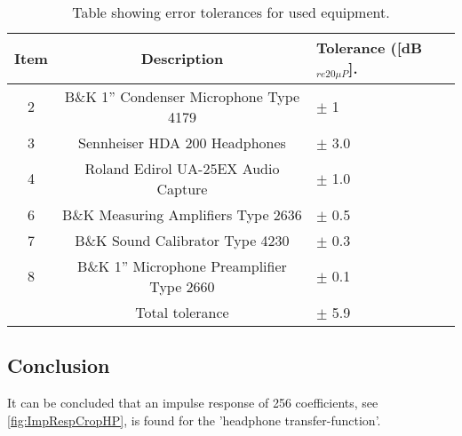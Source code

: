 \begin{table}[H]
	\centering
	\begin{tabular}{ c c l } \toprule
	{Item}	& 		{Description} 							& {Tolerance ([dB$_{re20\mu P}$]}.\\ \bottomrule 
		2	&	B\&K 1'' Condenser Microphone Type 4179 	& $\pm$ 1		\\
		3	&	Sennheiser HDA 200 Headphones				& $\pm$ 3.0		\\
		4	&	Roland Edirol UA-25EX Audio Capture			& $\pm$ 1.0		\\
		6	&	B\&K Measuring Amplifiers Type 2636			& $\pm$ 0.5		\\
		7	&	B\&K Sound Calibrator Type 4230				& $\pm$ 0.3		\\ 
		8	&	B\&K 1'' Microphone Preamplifier Type 2660	& $\pm$ 0.1		\\ \bottomrule
			&	Total tolerance								& $\pm$ 5.9		\\ \bottomrule	
	\end{tabular}
	\caption{Table showing error tolerances for used equipment.}
	\label{TolerancesHP}
\end{table}

\subsection{Conclusion}
It can be concluded that an impulse response of 256 coefficients, see \autoref{fig:ImpRespCropHP}, is found for the 'headphone transfer-function'.